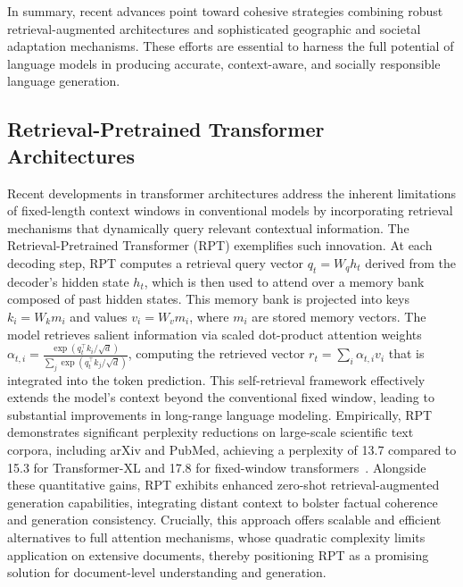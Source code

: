 \documentclass[sigconf]{acmart}
\begin{document}
In summary, recent advances point toward cohesive strategies combining robust retrieval-augmented architectures and sophisticated geographic and societal adaptation mechanisms. These efforts are essential to harness the full potential of language models in producing accurate, context-aware, and socially responsible language generation.

\subsection{Retrieval-Pretrained Transformer Architectures}

Recent developments in transformer architectures address the inherent limitations of fixed-length context windows in conventional models by incorporating retrieval mechanisms that dynamically query relevant contextual information. The Retrieval-Pretrained Transformer (RPT) exemplifies such innovation. At each decoding step, RPT computes a retrieval query vector \( q_t = W_q h_t \) derived from the decoder’s hidden state \( h_t \), which is then used to attend over a memory bank composed of past hidden states. This memory bank is projected into keys \( k_i = W_k m_i \) and values \( v_i = W_v m_i \), where \( m_i \) are stored memory vectors. The model retrieves salient information via scaled dot-product attention weights \(\alpha_{t,i} = \frac{\exp(q_t^\top k_i / \sqrt{d})}{\sum_j \exp(q_t^\top k_j / \sqrt{d})}\), computing the retrieved vector \( r_t = \sum_i \alpha_{t,i} v_i \) that is integrated into the token prediction. This self-retrieval framework effectively extends the model’s context beyond the conventional fixed window, leading to substantial improvements in long-range language modeling. Empirically, RPT demonstrates significant perplexity reductions on large-scale scientific text corpora, including arXiv and PubMed, achieving a perplexity of 13.7 compared to 15.3 for Transformer-XL and 17.8 for fixed-window transformers~\cite{ref29}. Alongside these quantitative gains, RPT exhibits enhanced zero-shot retrieval-augmented generation capabilities, integrating distant context to bolster factual coherence and generation consistency. Crucially, this approach offers scalable and efficient alternatives to full attention mechanisms, whose quadratic complexity limits application on extensive documents, thereby positioning RPT as a promising solution for document-level understanding and generation.
\end{document}
